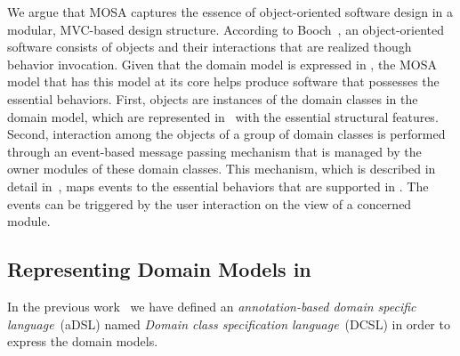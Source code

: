 We argue that MOSA captures the essence of object-oriented software design in a modular, MVC-based design structure. According to Booch~\cite{booch_object-oriented_1986}, an object-oriented software consists of objects and their interactions that are realized though behavior invocation. Given that the domain model is expressed in \dcsl, the MOSA model that has this model at its core helps produce software that possesses the essential behaviors. First, objects are instances of the domain classes in the domain model, which are represented in \dcsl~with the essential structural features. Second, interaction among the objects of a group of domain classes is performed through an event-based message passing mechanism that is managed by the owner modules of these domain classes. This mechanism, which is described in detail in~\cite{le_jdomainapp_2017}, maps events to the essential behaviors that are supported in \dcsl. The events can be triggered by the user interaction on the view of a concerned module. %
%

\subsection{Representing Domain Models in \dcsl}
\label{sect:bg-dcsl}

In the previous work~\cite{le_domain_2018} we have defined an \textit{annotation-based domain specific language}~(aDSL) named \textit{Domain class specification language}~(DCSL) in order to express the domain models. 

